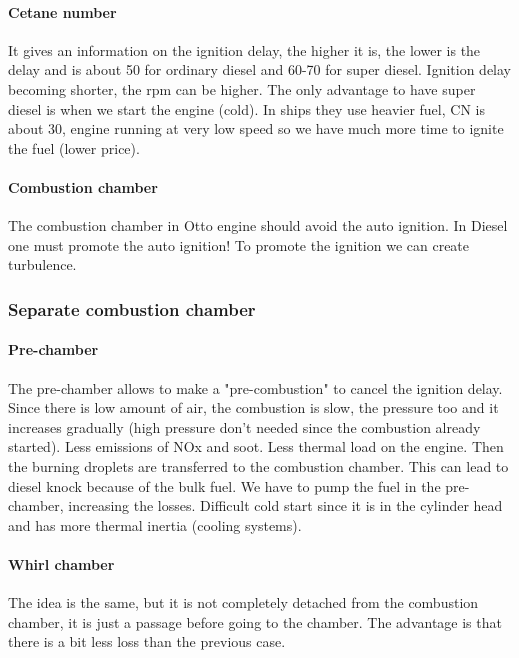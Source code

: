 	\paragraph{Cetane number}
	It gives an information on the ignition delay, the higher it is, the lower is the delay and is about 50 for ordinary diesel and 60-70 for super diesel. Ignition delay becoming shorter, the rpm can be higher. The only advantage to have super diesel is when we start the engine (cold). In ships they use heavier fuel, CN is about 30, engine running at very low speed so we have much more time to ignite the fuel (lower price). 

	\paragraph{Combustion chamber}
	The combustion chamber in Otto engine should avoid the auto ignition. In Diesel one must promote the auto ignition! To promote the ignition we can create turbulence. 
	
\subsubsection{Separate combustion chamber}
	\paragraph{Pre-chamber} 
	The pre-chamber allows to make a "pre-combustion" to cancel the ignition delay. Since there is low amount of air, the combustion is slow, the pressure too and it increases gradually (high pressure don't needed since the combustion already started). Less emissions of NOx and soot. Less thermal load on the engine. 
	Then the burning droplets are transferred to the combustion chamber. This can lead to diesel knock because of the bulk fuel. We have to pump the fuel in the pre-chamber, increasing the losses. Difficult cold start since it is in the cylinder head and has more thermal inertia (cooling systems).
	
	\paragraph{Whirl chamber}
	The idea is the same, but it is not completely detached from the combustion chamber, it is just a passage before going to the chamber. The advantage is that there is a bit less loss than the previous case. 
	
